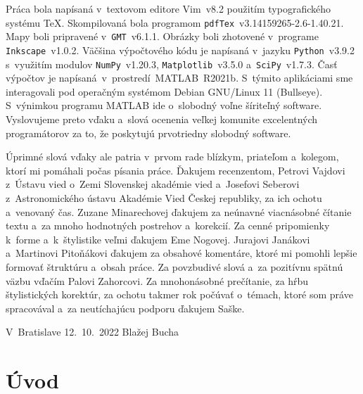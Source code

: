 \documentclass[a4paper, 12pt]{book}
\begin{document}
Práca bola napísaná v~textovom editore Vim~v8.2 použitím typografického systému
\TeX.  Skompilovaná bola programom \texttt{pdfTex}~v3.14159265-2.6-1.40.21.
Mapy boli pripravené v~\texttt{GMT}~v6.1.1.  Obrázky boli zhotovené v~programe
\texttt{Inkscape}~v1.0.2.  Väčšina výpočtového kódu je napísaná
v~jazyku \texttt{Python}~v3.9.2 s~využitím modulov
\texttt{NumPy}~v1.20.3, \texttt{Matplotlib}~v3.5.0 a~\texttt{SciPy}~v1.7.3.
Časť výpočtov je napísaná~v~prostredí~MATLAB~R2021b.
S~týmito aplikáciami sme interagovali pod operačným systémom Debian GNU/Linux
11 (Bullseye).  S~výnimkou programu MATLAB ide o~slobodný voľne šíriteľný
software.  Vyslovujeme preto vďaku a~slová ocenenia veľkej komunite
excelentných programátorov za to, že poskytujú prvotriedny slobodný software.

Úprimné slová vďaky ale patria v~prvom rade blízkym, priateľom a~kolegom, ktorí 
mi pomáhali počas písania práce.  Ďakujem recenzentom, Petrovi Vajdovi z~Ústavu 
vied o~Zemi Slovenskej akadémie vied a~Josefovi Seberovi z~Astronomického 
ústavu Akadémie Vied Českej republiky, za ich ochotu a~venovaný čas.  Zuzane 
Minarechovej ďakujem za neúnavné viacnásobné čítanie textu a~za mnoho 
hodnotných postrehov a~korekcií.  Za cenné pripomienky k~forme a~k~štylistike 
veľmi ďakujem Eme Nogovej.  Jurajovi Janákovi a~Martinovi Pitoňákovi ďakujem za 
obsahové komentáre, ktoré mi pomohli lepšie formovať štruktúru a~obsah práce.  
Za povzbudivé slová a~za pozitívnu spätnú väzbu vďačím Palovi Zahorcovi.  Za 
mnohonásobné prečítanie, za hŕbu štylistických korektúr, za ochotu takmer rok 
počúvať o~témach, ktoré som práve spracovával a~za neutíchajúcu podporu ďakujem 
Saške.


\vspace{4ex}

\noindent V~Bratislave 12.~10.~2022 \hfill Blažej Bucha






\tableofcontents
\newpage







\chapter*{Úvod}
\label{sec:introduction}
\end{document}
